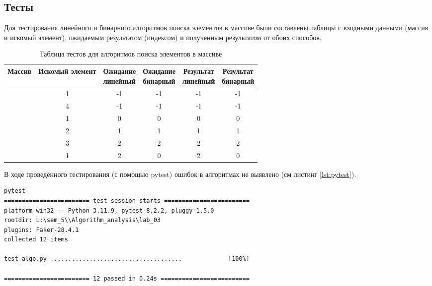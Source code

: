 \vspace{0.25cm}
\subsection{Тесты}

\hspace{1.25cm}
Для тестирования линейного и бинарного алгоритмов поиска элементов в массиве были составлены таблицы с входными данными (массив и искомый элемент), ожидаемым результатом (индексом) и полученным результатом от обоих способов.

\vspace{0.25cm}
\begin{table}[H]
    \centering
    \caption{Таблица тестов для алгоритмов поиска элементов в массиве}
    \renewcommand{\arraystretch}{1.5} %
    \begin{tabular}{|c|c|c|c|c|c|}
        \hline
        \textbf{Массив} & \textbf{Искомый элемент} & \makecell{\textbf{Ожидание}\\линейный} & \makecell{\textbf{Ожидание}\\бинарный} & \makecell{\textbf{Результат}\\линейный} & \makecell{\textbf{Результат}\\бинарный}\\
        \hline
        [] & 1 & -1 & -1 & -1 & -1 \\
        \hline
        [1, 2, 3] & 4 & -1 & -1 & -1 & -1 \\
        \hline
        [1, 2, 3] & 1 & 0 & 0 & 0 & 0 \\
        \hline
        [1, 2, 3] & 2 & 1 & 1 & 1 & 1 \\
        \hline
        [1, 2, 3] & 3 & 2 & 2 & 2 & 2 \\
        \hline
        [3, 2, 1] & 1 & 2 & 0 & 2 & 0 \\
        \hline
    \end{tabular}
\end{table}

В ходе проведённого тестирования (с помощью pytest) ошибок в алгоритмах не выявлено (см листинг \ref{lst:pytest}).

\vspace{0.25cm}
\begin{lstlisting}[caption=тестирование алгоритмов с помощью pytest]
pytest
======================== test session starts ========================
platform win32 -- Python 3.11.9, pytest-8.2.2, pluggy-1.5.0
rootdir: L:\sem_5\\Algorithm_analysis\lab_03
plugins: Faker-28.4.1
collected 12 items                                                                                                                                                                

test_algo.py .....................................             [100%]

======================== 12 passed in 0.24s =========================
\end{lstlisting}
\label{lst:pytest}

\newpage